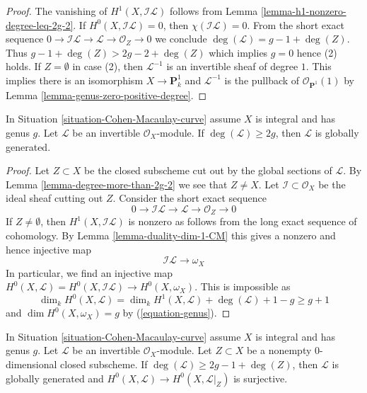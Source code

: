 \begin{proof}
The vanishing of $H^1(X, \mathcal{I}\mathcal{L})$ follows from
Lemma \ref{lemma-h1-nonzero-degree-leq-2g-2}.
If $H^0(X, \mathcal{I}\mathcal{L}) = 0$, then
$\chi(\mathcal{I}\mathcal{L}) = 0$. From the short exact
sequence $0 \to \mathcal{I}\mathcal{L} \to \mathcal{L} \to \mathcal{O}_Z \to 0$
we conclude $\deg(\mathcal{L}) = g - 1 + \deg(Z)$.
Thus $g - 1 + \deg(Z) > 2g - 2 + \deg(Z)$ which implies $g = 0$
hence (2) holds. If $Z = \emptyset$ in case (2),
then $\mathcal{L}^{-1}$ is an invertible sheaf of degree $1$.
This implies there is an isomorphism $X \to \mathbf{P}^1_k$ and
$\mathcal{L}^{-1}$ is the pullback of $\mathcal{O}_{\mathbf{P}^1}(1)$ by
Lemma \ref{lemma-genus-zero-positive-degree}.
\end{proof}

\begin{lemma}
\label{lemma-degree-more-than-2g}
\begin{reference}
\cite[Lemma 3]{Jongmin}
\end{reference}
In Situation \ref{situation-Cohen-Macaulay-curve}
assume $X$ is integral and has genus $g$.
Let $\mathcal{L}$ be an invertible $\mathcal{O}_X$-module.
If $\deg(\mathcal{L}) \geq 2g$, then $\mathcal{L}$
is globally generated.
\end{lemma}

\begin{proof}
Let $Z \subset X$ be the closed subscheme cut out by the
global sections of $\mathcal{L}$. By Lemma \ref{lemma-degree-more-than-2g-2}
we see that $Z \not = X$. Let $\mathcal{I} \subset \mathcal{O}_X$
be the ideal sheaf cutting out $Z$. Consider the short exact sequence
$$
0 \to \mathcal{I}\mathcal{L}
\to \mathcal{L} \to \mathcal{O}_Z \to 0
$$
If $Z \not = \emptyset$, then
$H^1(X, \mathcal{I}\mathcal{L})$ is nonzero
as follows from the long exact sequence of cohomology.
By Lemma \ref{lemma-duality-dim-1-CM} this gives a
nonzero and hence injective map
$$
\mathcal{I}\mathcal{L}
\longrightarrow
\omega_X
$$
In particular, we find an injective map
$H^0(X, \mathcal{L}) = H^0(X, \mathcal{I}\mathcal{L})
\to H^0(X, \omega_X)$. This is impossible as
$$
\dim_k H^0(X, \mathcal{L}) = \dim_k H^1(X, \mathcal{L}) +
\deg(\mathcal{L}) + 1 - g \geq g + 1
$$
and $\dim H^0(X, \omega_X) = g$ by (\ref{equation-genus}).
\end{proof}

\begin{lemma}
\label{lemma-degree-more-than-2g-1-and-Z}
In Situation \ref{situation-Cohen-Macaulay-curve}
assume $X$ is integral and has genus $g$.
Let $\mathcal{L}$ be an invertible $\mathcal{O}_X$-module.
Let $Z \subset X$ be a nonempty $0$-dimensional closed subscheme.
If $\deg(\mathcal{L}) \geq 2g - 1 + \deg(Z)$, then $\mathcal{L}$
is globally generated and $H^0(X, \mathcal{L}) \to H^0(X, \mathcal{L}|_Z)$
is surjective.
\end{lemma}

